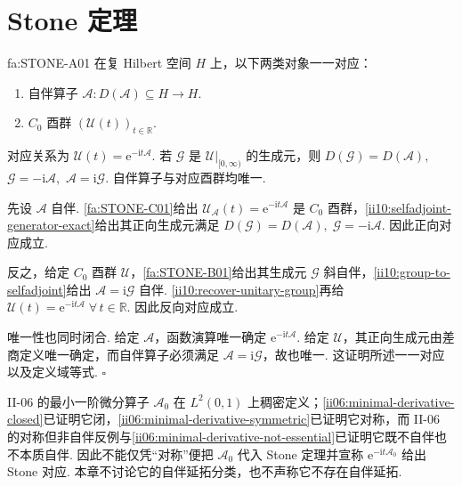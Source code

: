 \section{Stone 定理}\label{sec:ii10-stone-theorem}

\begin{FATheorem}[A][Stone 定理]{fa:STONE-A01}
在复 Hilbert 空间 \(\displaystyle H\) 上，以下两类对象一一对应：
\begin{enumerate}[label=\textnormal{(\roman*)}]
\item 自伴算子 \(\displaystyle\mathcal A:D(\mathcal A)\subseteq H\to H\).
\item \(\displaystyle C_0\) 酉群 \(\displaystyle(\mathcal U(t))_{t\in\mathbb R}\).
\end{enumerate}
对应关系为 \(\displaystyle \mathcal U(t)=\mathrm{e}^{-\mathrm{i}t\mathcal A}.\)
若 \(\displaystyle\mathcal G\) 是 \(\displaystyle\mathcal U|_{[0,\infty)}\) 的生成元，则 \(\displaystyle D(\mathcal G)=D(\mathcal A),\) \(\displaystyle \mathcal G=-\mathrm{i}\mathcal A,\) \(\displaystyle \mathcal A=\mathrm{i}\mathcal G.\)
自伴算子与对应酉群均唯一.
\end{FATheorem}

\begin{FAProof}
先设 \(\displaystyle\mathcal A\) 自伴. \autoref{fa:STONE-C01}给出 \(\displaystyle\mathcal U_{\mathcal A}(t)=\mathrm{e}^{-\mathrm{i}t\mathcal A}\) 是 \(\displaystyle C_0\) 酉群，\autoref{ii10:selfadjoint-generator-exact}给出其正向生成元满足 \(\displaystyle D(\mathcal G)=D(\mathcal A), \; \mathcal G=-\mathrm{i}\mathcal A.\)
因此正向对应成立.

反之，给定 \(\displaystyle C_0\) 酉群 \(\displaystyle\mathcal U\)，\autoref{fa:STONE-B01}给出其生成元 \(\displaystyle\mathcal G\) 斜自伴，\autoref{ii10:group-to-selfadjoint}给出 \(\displaystyle \mathcal A=\mathrm{i}\mathcal G\)
自伴. \autoref{ii10:recover-unitary-group}再给 \(\displaystyle \mathcal U(t)=\mathrm{e}^{-\mathrm{i}t\mathcal A} \; \forall\,t\in\mathbb R.\)
因此反向对应成立.

唯一性也同时闭合. 给定 \(\displaystyle\mathcal A\)，函数演算唯一确定 \(\displaystyle\mathrm{e}^{-\mathrm{i}t\mathcal A}\). 给定 \(\displaystyle\mathcal U\)，其正向生成元由差商定义唯一确定，而自伴算子必须满足 \(\displaystyle\mathcal A=\mathrm{i}\mathcal G\)，故也唯一. 这证明所述一一对应以及定义域等式.
\hfill\(\square\)
\end{FAProof}

\begin{FACounterexample}
II-06 的最小一阶微分算子 \(\displaystyle\mathcal A_0\) 在 \(\displaystyle L^2(0,1)\) 上稠密定义；\autoref{ii06:minimal-derivative-closed}已证明它闭，\autoref{ii06:minimal-derivative-symmetric}已证明它对称，而 II-06 的对称但非自伴反例与\autoref{ii06:minimal-derivative-not-essential}已证明它既不自伴也不本质自伴. 因此不能仅凭“对称”便把 \(\displaystyle\mathcal A_0\) 代入 Stone 定理并宣称 \(\displaystyle\mathrm{e}^{-\mathrm{i}t\mathcal A_0}\) 给出 Stone 对应. 本章不讨论它的自伴延拓分类，也不声称它不存在自伴延拓.
\end{FACounterexample}

